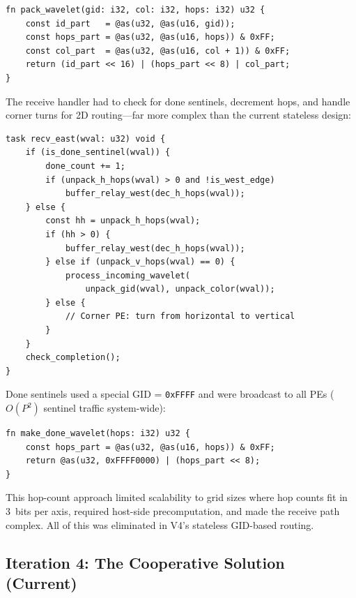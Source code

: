 \documentclass[11pt,letterpaper]{article}
\begin{document}
\begin{lstlisting}[language=CSL, caption={Wavelet packing (V1--V3)}, label=lst:pack:old]
fn pack_wavelet(gid: i32, col: i32, hops: i32) u32 {
    const id_part   = @as(u32, @as(u16, gid));
    const hops_part = @as(u32, @as(u16, hops)) & 0xFF;
    const col_part  = @as(u32, @as(u16, col + 1)) & 0xFF;
    return (id_part << 16) | (hops_part << 8) | col_part;
}
\end{lstlisting}

The receive handler had to check for done sentinels, decrement hops, and handle corner turns for 2D routing---far more complex than the current stateless design:

\begin{lstlisting}[language=CSL, caption={East receive handler (V1--V3)}, label=lst:recv:old]
task recv_east(wval: u32) void {
    if (is_done_sentinel(wval)) {
        done_count += 1;
        if (unpack_h_hops(wval) > 0 and !is_west_edge)
            buffer_relay_west(dec_h_hops(wval));
    } else {
        const hh = unpack_h_hops(wval);
        if (hh > 0) {
            buffer_relay_west(dec_h_hops(wval));
        } else if (unpack_v_hops(wval) == 0) {
            process_incoming_wavelet(
                unpack_gid(wval), unpack_color(wval));
        } else {
            // Corner PE: turn from horizontal to vertical
        }
    }
    check_completion();
}
\end{lstlisting}

Done sentinels used a special GID = \texttt{0xFFFF} and were broadcast to all PEs ($O(P^2)$ sentinel traffic system-wide):

\begin{lstlisting}[language=CSL, numbers=none, caption={Done sentinel (V1--V3 broadcast-style)}]
fn make_done_wavelet(hops: i32) u32 {
    const hops_part = @as(u32, @as(u16, hops)) & 0xFF;
    return @as(u32, 0xFFFF0000) | (hops_part << 8);
}
\end{lstlisting}

This hop-count approach limited scalability to grid sizes where hop counts fit in 3~bits per axis, required host-side precomputation, and made the receive path complex. All of this was eliminated in V4's stateless GID-based routing.

\subsection{Iteration 4: The Cooperative Solution (Current)}
\label{sec:cooperative}
\end{document}
